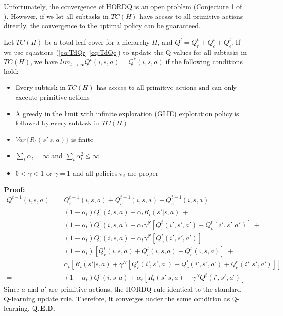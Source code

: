 Unfortunately, the convergence of HORDQ is an open problem (Conjecture 1 of \cite{HORDQ}).
However, if we let all subtasks in $TC(H)$ have access to all primitive actions directly, 
the convergence to the optimal policy can be guaranteed. 
\begin{theorem}
    Let $TC(H)$ be a total leaf cover for a hierarchy $H$, and $Q^t = Q_r^t + Q_c^t + Q_e^t$.
    If we use equations (\ref{eq:TdQr}-\ref{eq:TdQe}) to update the Q-values for all subtasks in $TC(H)$, 
    we have $lim_{t \rightarrow \infty} Q^t(i, s, a) = Q^*(i, s, a)$
    if the following conditions hold:
    \begin{itemize}{}
    \item Every subtask in $TC(H)$ has access to all primitive actions and can only execute primitive actions
    \item A greedy in the limit with infinite exploration (GLIE) exploration policy is followed by every subtask in $TC(H)$
    \item $Var\{R_t(s' | s, a)\}$ is finite 
    \item $\sum_t \alpha_t = \infty$ and  $\sum_t \alpha_t^2 \le \infty$
    \item $0 < \gamma < 1$ or $\gamma=1$ and all policies $\pi_i$ are proper
    \end{itemize}
 
\end{theorem}
\textbf{Proof:} 
\begin{align*}
    Q^{t+1}(i, s, a) = &Q_r^{t+1}(i, s, a) + Q_c^{t+1}(i, s, a) + Q_e^{t+1}(i, s, a) \\
                     = &(1 - \alpha_t){Q}_r^{t}(i, s, a) + \alpha_t R_t(s'| s, a) \ +\\
                       &(1 - \alpha_t){Q}_c^{t}(i, s, a) + \alpha_t \gamma^N[{Q}_r^{t}(i', s', a') + {Q}_c^t(i', s', a')] \ +\\
                       &(1 - \alpha_t){Q}_e^{t}(i, s, a) + \alpha_t \gamma^N[{Q}_e^{t}(i', s', a')]\\
                      =&(1 - \alpha_t)[{Q}_r^{t}(i, s, a) + {Q}_c^{t}(i, s, a) + {Q}_e^{t}(i, s, a)] \ +\\
                       &\alpha_t[ R_t(s'| s, a) + \gamma^N[{Q}_r^{t}(i', s', a') + {Q}_c^t(i', s', a') + {Q}_e^{t}(i', s', a')]] \\
                      =&(1 - \alpha_t) {Q}^{t}(i, s, a) + \alpha_t[ R_t(s'| s, a) + \gamma^N  {Q}^{t}(i', s', a') ]
\end{align*}
Since $a$ and $a'$ are primitive actions, the HORDQ rule identical to the standard Q-learning update rule.
Therefore, it converges under the same condition as Q-learning. \textbf{Q.E.D.}


